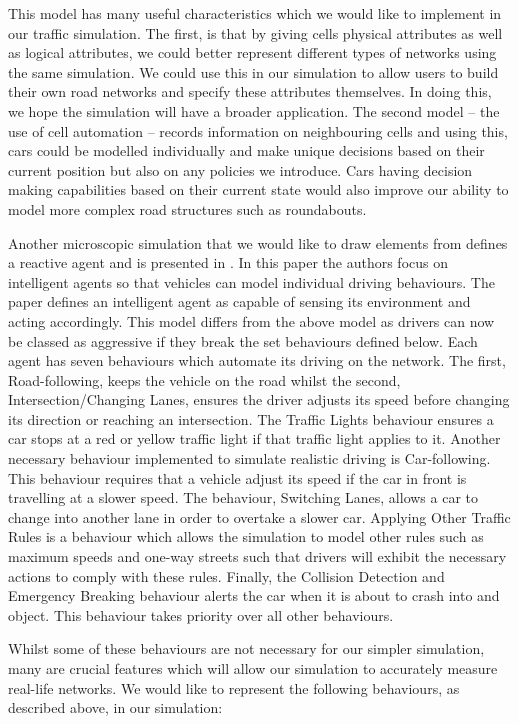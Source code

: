 \documentclass{article}
\begin{document}
	This model has many useful characteristics which we would like to implement in our traffic simulation. The first, is that by giving cells physical attributes as well as logical attributes, we could better represent different types of networks using the same simulation. 
	We could use this in our simulation to allow users to build their own road networks and specify these attributes themselves. In doing this, we hope the simulation will have a broader application. 
	The second model -- the use of cell automation -- records information on neighbouring cells and using this, cars could be modelled individually and make unique decisions based on their current position but also on any policies we introduce. 
	Cars having decision making capabilities based on their current state would also improve our ability to model more complex road structures such as roundabouts.  
	
	Another microscopic simulation that we would like to draw elements from defines a reactive agent and is presented in \cite{ehlert2001microscopic}. In this paper the authors focus on intelligent agents so that vehicles can model individual driving behaviours. 
	The paper defines an intelligent agent as capable of sensing its environment and acting accordingly. This model differs from the above model as drivers can now be classed as aggressive if they break the set behaviours defined below. 
	Each agent has seven behaviours which automate its driving on the network. 
	The first, Road-following, keeps the vehicle on the road whilst the second, Intersection/Changing Lanes, ensures the driver adjusts its speed before changing its direction or reaching an intersection. 
	The Traffic Lights behaviour ensures a car stops at a red or yellow traffic light if that traffic light applies to it.  
	Another necessary behaviour implemented to simulate realistic driving is Car-following. 
	This behaviour requires that a vehicle adjust its speed if the car in front is travelling at a slower speed. 
	The behaviour, Switching Lanes, allows a car to change into another lane in order to overtake a slower car. 
	Applying Other Traffic Rules is a behaviour which allows the simulation to model other rules such as maximum speeds and one-way streets such that drivers will exhibit the necessary actions to comply with these rules. 
	Finally, the Collision Detection and Emergency Breaking behaviour alerts the car when it is about to crash into and object. 
	This behaviour takes priority over all other behaviours. 
	
	Whilst some of these behaviours are not necessary for our simpler simulation, many are crucial features which will allow our simulation to accurately measure real-life networks. 
	We would like to represent the following behaviours, as described above, in our simulation: 
	
\end{document}
